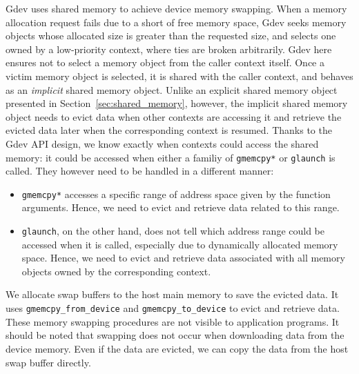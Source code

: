 Gdev uses shared memory to achieve device memory swapping.
When a memory allocation request fails due to a short of free memory
space, Gdev seeks memory objects whose allocated size is greater than
the requested size, and selects one owned by a low-priority context,
where ties are broken arbitrarily.
Gdev here ensures not to select a memory object from the caller context
itself.
Once a victim memory object is selected, it is shared with the caller
context, and behaves as an \textit{implicit} shared memory object.
Unlike an explicit shared memory object presented in
Section~\ref{sec:shared_memory}, however, the implicit shared memory
object needs to evict data when other contexts are accessing it and
retrieve the evicted data later when the corresponding context is
resumed.
Thanks to the Gdev API design, we know exactly when contexts could
access the shared memory: it could be accessed when either a familiy of
\texttt{gmemcpy*} or \texttt{glaunch} is called.
They however need to be handled in a different manner:
\begin{itemize}
 \vspace{-0.25em}
 \item \texttt{gmemcpy*} accesses a specific range of address space
       given by the function arguments.
       Hence, we need to evict and retrieve data related to this range.
 \vspace{-0.5em}
 \item \texttt{glaunch}, on the other hand, does not tell which address
       range could be accessed when it is called, especially due to
       dynamically allocated memory space.
       Hence, we need to evict and retrieve data associated with all
       memory objects owned by the corresponding context.
 \vspace{-0.25em}
\end{itemize}

We allocate swap buffers to the host main memory to save the evicted
data.
It uses \texttt{gmemcpy\_from\_device} and \texttt{gmemcpy\_to\_device}
to evict and retrieve data.
These memory swapping procedures are not visible to application programs.
It should be noted that swapping does not occur when downloading data
from the device memory.
Even if the data are evicted, we can copy the data from the host swap
buffer directly.

